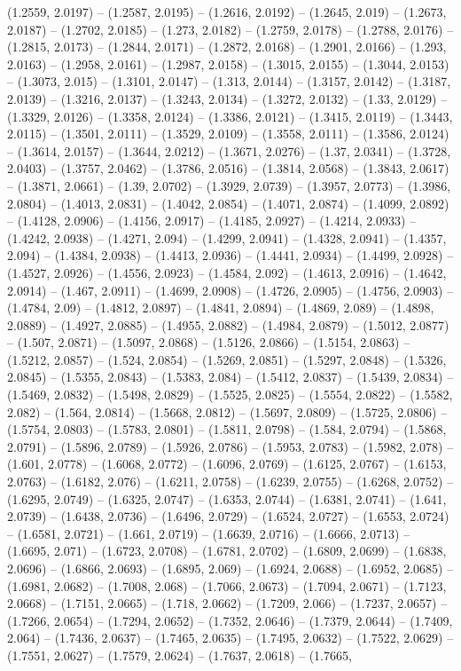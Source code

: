 (1.2559, 2.0197) -- (1.2587, 2.0195) -- (1.2616, 2.0192) -- (1.2645, 2.019) -- (1.2673, 2.0187) -- (1.2702, 2.0185) -- (1.273, 2.0182) -- (1.2759, 2.0178) -- (1.2788, 2.0176) -- (1.2815, 2.0173) -- (1.2844, 2.0171) -- (1.2872, 2.0168) -- (1.2901, 2.0166) -- (1.293, 2.0163) -- (1.2958, 2.0161) -- (1.2987, 2.0158) -- (1.3015, 2.0155) -- (1.3044, 2.0153) -- (1.3073, 2.015) -- (1.3101, 2.0147) -- (1.313, 2.0144) -- (1.3157, 2.0142) -- (1.3187, 2.0139) -- (1.3216, 2.0137) -- (1.3243, 2.0134) -- (1.3272, 2.0132) -- (1.33, 2.0129) -- (1.3329, 2.0126) -- (1.3358, 2.0124) -- (1.3386, 2.0121) -- (1.3415, 2.0119) -- (1.3443, 2.0115) -- (1.3501, 2.0111) -- (1.3529, 2.0109) -- (1.3558, 2.0111) -- (1.3586, 2.0124) -- (1.3614, 2.0157) -- (1.3644, 2.0212) -- (1.3671, 2.0276) -- (1.37, 2.0341) -- (1.3728, 2.0403) -- (1.3757, 2.0462) -- (1.3786, 2.0516) -- (1.3814, 2.0568) -- (1.3843, 2.0617) -- (1.3871, 2.0661) -- (1.39, 2.0702) -- (1.3929, 2.0739) -- (1.3957, 2.0773) -- (1.3986, 2.0804) -- (1.4013, 2.0831) -- (1.4042, 2.0854) -- (1.4071, 2.0874) -- (1.4099, 2.0892) -- (1.4128, 2.0906) -- (1.4156, 2.0917) -- (1.4185, 2.0927) -- (1.4214, 2.0933) -- (1.4242, 2.0938) -- (1.4271, 2.094) -- (1.4299, 2.0941) -- (1.4328, 2.0941) -- (1.4357, 2.094) -- (1.4384, 2.0938) -- (1.4413, 2.0936) -- (1.4441, 2.0934) -- (1.4499, 2.0928) -- (1.4527, 2.0926) -- (1.4556, 2.0923) -- (1.4584, 2.092) -- (1.4613, 2.0916) -- (1.4642, 2.0914) -- (1.467, 2.0911) -- (1.4699, 2.0908) -- (1.4726, 2.0905) -- (1.4756, 2.0903) -- (1.4784, 2.09) -- (1.4812, 2.0897) -- (1.4841, 2.0894) -- (1.4869, 2.089) -- (1.4898, 2.0889) -- (1.4927, 2.0885) -- (1.4955, 2.0882) -- (1.4984, 2.0879) -- (1.5012, 2.0877) -- (1.507, 2.0871) -- (1.5097, 2.0868) -- (1.5126, 2.0866) -- (1.5154, 2.0863) -- (1.5212, 2.0857) -- (1.524, 2.0854) -- (1.5269, 2.0851) -- (1.5297, 2.0848) -- (1.5326, 2.0845) -- (1.5355, 2.0843) -- (1.5383, 2.084) -- (1.5412, 2.0837) -- (1.5439, 2.0834) -- (1.5469, 2.0832) -- (1.5498, 2.0829) -- (1.5525, 2.0825) -- (1.5554, 2.0822) -- (1.5582, 2.082) -- (1.564, 2.0814) -- (1.5668, 2.0812) -- (1.5697, 2.0809) -- (1.5725, 2.0806) -- (1.5754, 2.0803) -- (1.5783, 2.0801) -- (1.5811, 2.0798) -- (1.584, 2.0794) -- (1.5868, 2.0791) -- (1.5896, 2.0789) -- (1.5926, 2.0786) -- (1.5953, 2.0783) -- (1.5982, 2.078) -- (1.601, 2.0778) -- (1.6068, 2.0772) -- (1.6096, 2.0769) -- (1.6125, 2.0767) -- (1.6153, 2.0763) -- (1.6182, 2.076) -- (1.6211, 2.0758) -- (1.6239, 2.0755) -- (1.6268, 2.0752) -- (1.6295, 2.0749) -- (1.6325, 2.0747) -- (1.6353, 2.0744) -- (1.6381, 2.0741) -- (1.641, 2.0739) -- (1.6438, 2.0736) -- (1.6496, 2.0729) -- (1.6524, 2.0727) -- (1.6553, 2.0724) -- (1.6581, 2.0721) -- (1.661, 2.0719) -- (1.6639, 2.0716) -- (1.6666, 2.0713) -- (1.6695, 2.071) -- (1.6723, 2.0708) -- (1.6781, 2.0702) -- (1.6809, 2.0699) -- (1.6838, 2.0696) -- (1.6866, 2.0693) -- (1.6895, 2.069) -- (1.6924, 2.0688) -- (1.6952, 2.0685) -- (1.6981, 2.0682) -- (1.7008, 2.068) -- (1.7066, 2.0673) -- (1.7094, 2.0671) -- (1.7123, 2.0668) -- (1.7151, 2.0665) -- (1.718, 2.0662) -- (1.7209, 2.066) -- (1.7237, 2.0657) -- (1.7266, 2.0654) -- (1.7294, 2.0652) -- (1.7352, 2.0646) -- (1.7379, 2.0644) -- (1.7409, 2.064) -- (1.7436, 2.0637) -- (1.7465, 2.0635) -- (1.7495, 2.0632) -- (1.7522, 2.0629) -- (1.7551, 2.0627) -- (1.7579, 2.0624) -- (1.7637, 2.0618) -- (1.7665, 